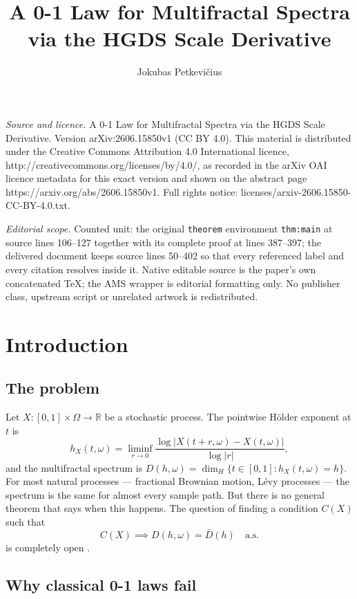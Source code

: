 \documentclass[10pt,a4paper]{amsart}
\newcommand{\R}{\mathbb{R}}
\begin{document}
\title[A 0-1 Law for Multifractal Spectra via the HGDS Scale Deriva]{A 0-1 Law for Multifractal Spectra via the HGDS Scale Derivative}
\author{Jokubas Petkevičius}
\date{}
\maketitle
\noindent\emph{Source and licence.} A 0-1 Law for Multifractal Spectra via the HGDS Scale Derivative. Version arXiv:2606.15850v1 (CC BY 4.0). This material is distributed under the Creative Commons Attribution 4.0 International licence, http://creativecommons.org/licenses/by/4.0/, as recorded in the arXiv OAI licence metadata for this exact version and shown on the abstract page https://arxiv.org/abs/2606.15850v1. Full rights notice: licenses/arxiv-2606.15850-CC-BY-4.0.txt.\par\smallskip
\noindent\textit{Editorial scope.} Counted unit: the original \texttt{theorem} environment \texttt{thm:main} at source lines 106--127 together with its complete proof at lines 387--397; the delivered document keeps source lines 50--402 so that every referenced label and every citation resolves inside it. Native editable source is the paper's own concatenated TeX; the AMS wrapper is editorial formatting only. No publisher class, upstream script or unrelated artwork is redistributed.
\section{Introduction}

\subsection{The problem}

Let $X:[0,1]\times\Omega\to\R$ be a stochastic process. The pointwise
H\"{o}lder exponent at $t$ is
\[
  h_X(t,\omega)
  = \liminf_{r\to0}\frac{\log|X(t+r,\omega)-X(t,\omega)|}{\log|r|},
\]
and the multifractal spectrum is
$D(h,\omega)=\dim_H\{t\in[0,1]:h_X(t,\omega)=h\}$. For most natural
processes --- fractional Brownian motion, L\'{e}vy processes --- the
spectrum is the same for almost every sample path. But there is no
general theorem that says when this happens. The question of finding a
condition $C(X)$ such that
\[
  C(X)\implies D(h,\omega)=\bar D(h)\quad\text{a.s.}
\]
is completely open \cite{jaffardseuret2022}.

\subsection{Why classical 0-1 laws fail}
\end{document}
